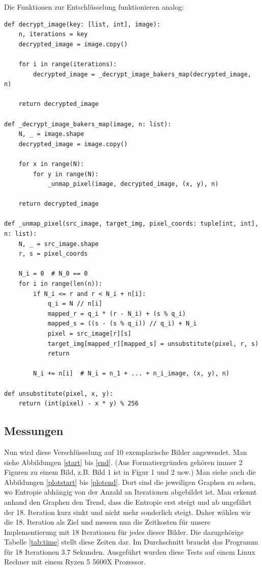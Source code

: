 Die Funktionen zur Entschlüsselung funktionieren analog:
\begin{lstlisting}
def decrypt_image(key: [list, int], image):
    n, iterations = key
    decrypted_image = image.copy()

    for i in range(iterations):
        decrypted_image = _decrypt_image_bakers_map(decrypted_image, n)

    return decrypted_image

def _decrypt_image_bakers_map(image, n: list):
    N, _ = image.shape
    decrypted_image = image.copy()

    for x in range(N):
        for y in range(N):
            _unmap_pixel(image, decrypted_image, (x, y), n)

    return decrypted_image

def _unmap_pixel(src_image, target_img, pixel_coords: tuple[int, int], n: list):
    N, _ = src_image.shape
    r, s = pixel_coords

    N_i = 0  # N_0 == 0
    for i in range(len(n)):
        if N_i <= r and r < N_i + n[i]:
            q_i = N // n[i]
            mapped_r = q_i * (r - N_i) + (s % q_i)
            mapped_s = ((s - (s % q_i)) // q_i) + N_i
            pixel = src_image[r][s]
            target_img[mapped_r][mapped_s] = unsubstitute(pixel, r, s)
            return

        N_i += n[i]  # N_i = n_1 + ... + n_i_image, (x, y), n)

def unsubstitute(pixel, x, y):
    return (int(pixel) - x * y) % 256
\end{lstlisting}


\subsection{Messungen}
Nun wird diese Verschlüsselung auf 10 exemplarische Bilder angewendet. Man siehe Abbildungen \ref{start} bis \ref{end}. (Aus Formatiergründen
gehören immer 2 Figuren zu einem Bild, z.B. Bild 1 ist in Figur 1 und 2 usw.)
Man siehe auch die Abbildungen \ref{plotstart} bis \ref{plotend}. Dort sind die jeweiligen Graphen zu sehen, wo Entropie
abhängig von der Anzahl an Iterationen abgebildet ist. Man erkennt anhand den Graphen den Trend, dass die Entropie erst steigt und
ab ungefährt der 18. Iteration kurz sinkt und nicht mehr sonderlich steigt. Daher wählen wir die 18. Iteration als Ziel und messen
nun die Zeitkosten für unsere Implementierung mit 18 Iterationen für jedes dieser Bilder. Die dazugehörige Tabelle \ref{tab:time} stellt diese Zeiten dar.
Im Durchschnitt braucht das Programm für 18 Iterationen 3.7 Sekunden. Ausgeführt wurden diese Tests auf einem Linux Rechner mit einem Ryzen 5 5600X Prozessor.


